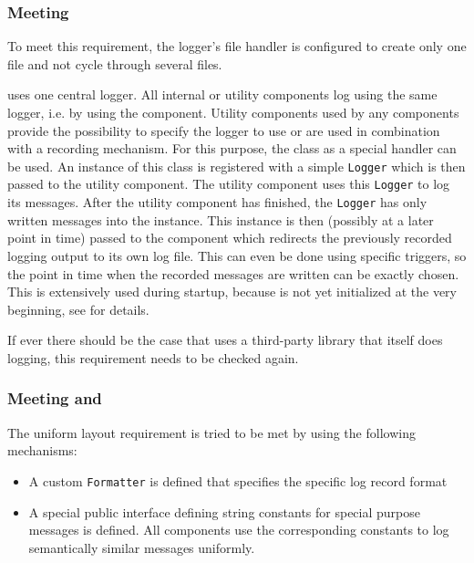 \subsubsection{Meeting \REQUlogOneLogfile{}}
\label{sec:MeetingREQUlogOneLogfile}

To meet this requirement, the logger's file handler is configured to create only one file and not cycle through several files.

\LibName{} uses one central logger. All \LibName{} internal or utility components log using the same logger, i.e. by using the \COMPlogging{} component. Utility components used by any \LibName{} components provide the possibility to specify the logger to use or are used in combination with a recording mechanism. For this purpose, the class \CLASSrecordingHandler{} as a special handler can be used. An instance of this class is registered with a simple \texttt{Logger} which is then passed to the utility component. The utility component uses this \texttt{Logger} to log its messages. After the utility component has finished, the \texttt{Logger} has only written messages into the \CLASSrecordingHandler{} instance. This instance is then (possibly at a later point in time) passed to the \COMPlogging{} component which redirects the previously recorded logging output to its own log file. This can even be done using specific triggers, so the point in time when the recorded messages are written can be exactly chosen. This is extensively used during \LibName{} startup, because \COMPlogging{} is not yet initialized at the very beginning, see  for details.

If ever there should be the case that \LibName{} uses a third-party library that itself does logging, this requirement needs to be checked again.


\subsubsection{Meeting \REQUlogUniLayout{} and \REQUlogSearchPatterns{}}
\label{sec:MeetingREQUlogUniLayout}

The uniform layout requirement is tried to be met by using the following mechanisms:
\begin{itemize}
	\item A custom \texttt{Formatter} is defined that specifies the specific log record format
	\item A special public interface defining string constants for special purpose messages is defined. All \LibName{} components use the corresponding constants to log semantically similar messages uniformly.
\end{itemize}

